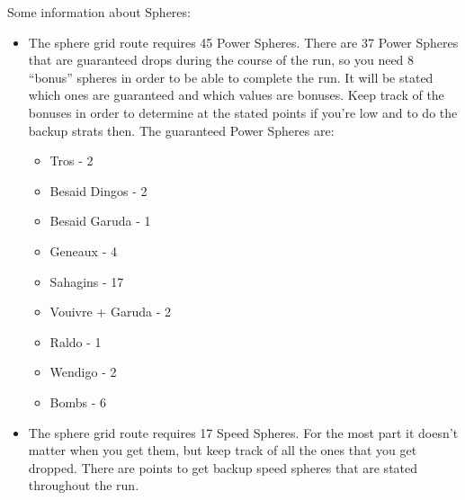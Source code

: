 Some information about Spheres:

\begin{itemize}
    \item The sphere grid route requires 45 Power Spheres. There are 37 Power Spheres that are guaranteed drops during the course of the run, so you need 8 ``bonus'' spheres in order to be able to complete the run. It will be stated which ones are guaranteed and which values are bonuses. Keep track of the bonuses in order to determine at the stated points if you're low and to do the backup strats then. The guaranteed Power Spheres are:
    \begin{itemize}
        \item Tros - 2
        \item Besaid Dingos - 2
        \item Besaid Garuda - 1
        \item Geneaux - 4
        \item Sahagins - 17
        \item Vouivre + Garuda - 2
        \item Raldo - 1
        \item Wendigo - 2
        \item Bombs - 6
    \end{itemize}
    \item The sphere grid route requires 17 Speed Spheres. For the most part it doesn't matter when you get them, but keep track of all the ones that you get dropped. There are points to get backup speed spheres that are stated throughout the run.
\end{itemize}

